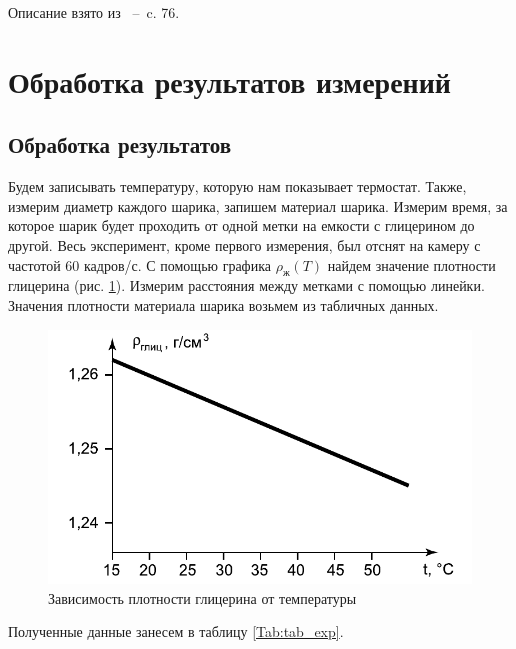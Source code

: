 \documentclass[a4paper,12pt]{article}
\begin{document}
Описание взято из \cite{Gladun:PrakTermodin}~--~c. 76.

\section{Обработка результатов измерений}
\subsection{Обработка результатов}

Будем записывать температуру, которую нам показывает термостат. Также, измерим диаметр каждого шарика, запишем материал шарика. Измерим время, за которое шарик будет проходить от одной метки на емкости с глицерином до другой. Весь эксперимент, кроме первого измерения, был отснят на камеру с частотой 60 кадров/с. С помощью графика $\rho_{\text{ж}}(T)$ найдем значение плотности глицерина (рис. \ref{ro_graph}). Измерим расстояния между метками с помощью линейки. Значения плотности материала шарика возьмем из табличных данных.

\begin{figure}%
	\centering
	\includegraphics[width=0.7\linewidth]{ro_graph}
	\caption{Зависимость плотности глицерина от температуры}
	\label{ro_graph}
\end{figure}

Полученные данные занесем в таблицу \ref{Tab:tab_exp}.
 
\end{document}
